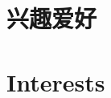 \ifInterestsSection

\renewcommand{\listitemsymbol}{-~} %

\ifChinese

\section{兴趣爱好}

\else  %

\section{Interests}

\fi  %

\fi  %

